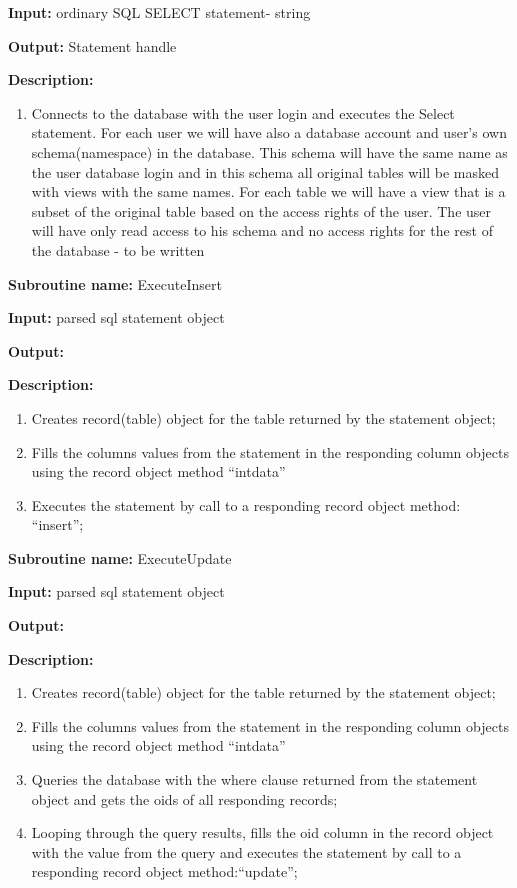 \textbf{Input:} ordinary SQL SELECT statement- string

\textbf{Output:} Statement handle 

\textbf{Description:}

\begin{enumerate}
\item Connects to the database with the user login and executes the Select statement. For each user we will have also a database account and user's own schema(namespace) in the database. This schema will have the same name as the user database login and in this schema all original tables will be masked with views with the same names. For each table we will have a view that is a subset of the original table based on the access rights of the user. The user will have only read access to his schema and no access rights for the rest of the database   - to be written
\end{enumerate}

\textbf{Subroutine name:} ExecuteInsert

\textbf{Input:} parsed sql statement object

\textbf{Output:} 

\textbf{Description: }
\begin{enumerate}
\item Creates record(table) object for the table returned by the statement object; 
\item Fills the columns values from the statement in the responding column objects using the record object method {}``intdata''
\item Executes the statement by call to a responding record object method:
{}``insert'';

\end{enumerate}


\textbf{Subroutine name:} ExecuteUpdate

\textbf{Input:} parsed sql statement object

\textbf{Output:} 

\textbf{Description: }

\begin{enumerate}
\item Creates record(table) object for the table returned by the statement object; 
\item Fills the columns values from the statement in the responding column objects using the record object method {}``intdata''
\item Queries the database with the where clause returned from the statement object and gets the oids of all responding records;
\item Looping through the query results, fills the oid column in the record object with the value from the query and executes the statement by call to a responding record object method:{}``update'';

\end{enumerate}


